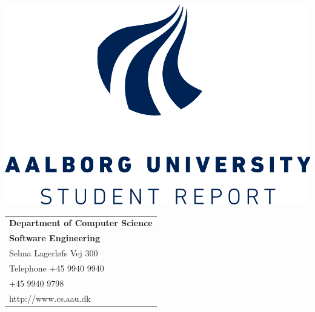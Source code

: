\begin{titlingpage}
\begin{nopagebreak}
{\samepage 

\begin{minipage}{0.3\textwidth}
	\begin{flushleft} 
		\includegraphics[scale=0.13]{img/titelblad/logo.png}\\
	\end{flushleft}
\end{minipage}
\begin{minipage}{0.65\textwidth}
	\begin{flushright}
		\begin{tabular}{l}
			{\textsf{\small \textbf{Department of Computer Science}}}\\
			{\textsf{\small  \textbf{Software Engineering}}} \\
			{\textsf{\small Selma Lagerløfs Vej 300}} \\
			{\textsf{\small Telephone +45 9940 9940}} \\
			{\textsf{\small +45 9940 9798}} \\
			{\textsf{\small http://www.cs.aau.dk}}
		\end{tabular}
	\end{flushright}
\end{minipage}\\[0.5cm]

}
\end{nopagebreak}
\end{titlingpage}

